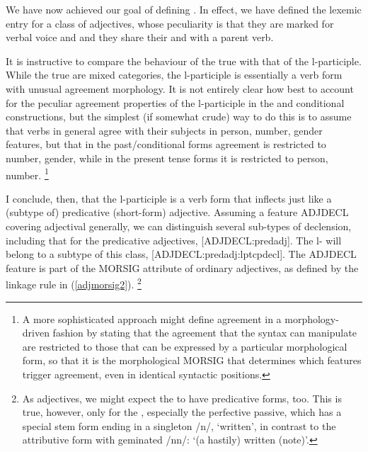 \documentclass[output=paper,
modfonts
]{LSP/langsci}
\begin{document}
We have now achieved our goal of defining . In effect, we have defined the lexemic entry for a class of adjectives, whose peculiarity is that they are marked for verbal voice and  and they share their  and  with a parent verb. 


It is instructive to compare the behaviour of the true  with that of the l-participle. While the true  are mixed categories, the l-participle is essentially a verb form with unusual agreement morphology. It is not entirely clear how best to account for the peculiar agreement properties of the l-participle in the  and conditional constructions, but the simplest (if somewhat crude) way to do this is to assume that verbs in general agree with their subjects in person, number, gender features, but that in the past/conditional forms agreement is restricted to number, gender, while in the present tense forms it is restricted to person, number.%
\footnote{A more sophisticated approach might define agreement in a morphology-driven fashion by stating that the agreement  that the syntax can manipulate are restricted to those that can be expressed by a particular morphological form, so that it is the morphological MORSIG that determines which features trigger agreement, even in identical syntactic positions.} %

I conclude, then, that the  l-participle is a verb form that inflects just like a (subtype of) predicative (short-form) adjective. Assuming a feature {ADJDECL} covering adjectival  generally, we can distinguish several sub-types of declension, including that for the predicative adjectives, [{ADJDECL}:predadj]. The l- will belong to a subtype of this class, [{ADJDECL}:predadj:lptcpdecl]. The {ADJDECL} feature is part of the MORSIG attribute of ordinary adjectives, as defined by the  linkage rule in (\ref{adjmorsig2}).%
\footnote{As adjectives, we might expect the  to have predicative forms, too. This is true, however, only for the  , especially the perfective passive,  which has a special stem form ending in a singleton /n/,  ‘written’, in contrast to the attributive form with geminated /nn/:  ‘(a hastily) written (note)’.} %
\end{document}
